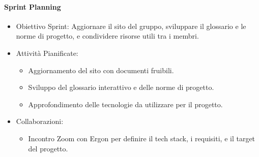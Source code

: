 \documentclass{article}
\begin{document}
                \paragraph{Sprint Planning}
                    \begin{itemize}
                        \item Obiettivo Sprint: Aggiornare il sito del gruppo, sviluppare il glossario e le norme di progetto, e condividere risorse utili tra i membri.
                        \item Attività Pianificate:
                            \begin{itemize}
                                \item Aggiornamento del sito con documenti fruibili.
                                \item Sviluppo del glossario interattivo e delle norme di progetto.
                                \item Approfondimento delle tecnologie da utilizzare per il progetto.
                            \end{itemize}
                        \item Collaborazioni:
                            \begin{itemize}
                                \item Incontro Zoom con Ergon per definire il tech stack, i requisiti, e il target del progetto.
                            \end{itemize}
                    \end{itemize}

\end{document}
